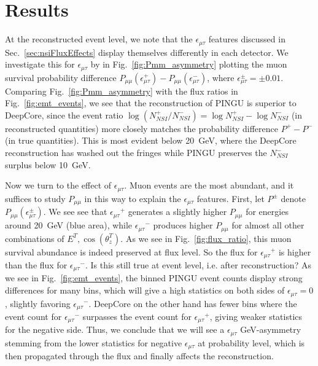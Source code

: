 \documentclass[draft=True]{revtex4-2}
\newcommand{\ztrue}{\ensuremath{\cos{(\theta_z^{T})}}}
\newcommand{\emt}{\ensuremath{\epsilon_{\mu\tau}}}
\newcommand{\Etrue}{E^{T}}
\begin{document}
\section{Results}
At the reconstructed event level, we note that the $\emt$ features discussed in Sec.~\ref{sec:nsiFluxEffects} display themselves differently in each detector.
We investigate this for $\emt$ by in Fig.~\ref{fig:Pmm_asymmetry} plotting the muon survival probability difference $P_{\mu\mu}(\epsilon^+_{\mu\tau}) - P_{\mu\mu}(\epsilon^-_{\mu\tau})$, where 
$\epsilon^\pm_{\mu\tau} = \pm 0.01$.
Comparing Fig.~\ref{fig:Pmm_asymmetry} with the flux ratios in Fig.~\ref{fig:emt_events}, we see that the reconstruction of PINGU is
superior to DeepCore, since the event ratio $\log{(N^+_{NSI}/N^-_{NSI})} = \log{N^+_{NSI}} - \log{N^-_{NSI}}$ (in reconstructed quantities) 
more closely matches the probability difference $P^+-P^-$ (in true quantities).
This is most evident below \SI{20}{\GeV}, where the DeepCore reconstruction has washed out the fringes while PINGU preserves the $N^-_{NSI}$ surplus below \SI{10}{\GeV}.

Now we turn to the effect of $\emt$. Muon events are the most abundant, and it suffices to study $P_{\mu\mu}$ in this way to explain the $\emt$ features. 
First, let $P^\pm$ denote $P_{\mu\mu}(\epsilon^\pm_{\mu\tau})$. 
We see see that $\emt^+$ generates a slightly higher $P_{\mu\mu}$ for energies around \SI{20}{\GeV} (blue area),
while $\emt^-$ produces higher $P_{\mu\mu}$ for almost all other combinations of ${\Etrue,\ztrue}$. As we see in Fig.~\ref{fig:flux_ratio}, this muon survival abundance 
is indeed preserved at flux level. So the flux for $\emt^+$ is higher than the flux for $\emt^-$. Is this still true at event level, i.e. after reconstruction? 
As we see in Fig.~\ref{fig:emt_events}, the binned PINGU event counts display strong differences for many bins, which will give a high statistics on both sides of $\emt=0$, slightly favoring $\emt^-$. 
DeepCore on the other hand has fewer bins where the event count for $\emt^-$ surpasses the event count for $\emt^+$, 
giving weaker statistics for the negative side. Thus, we conclude that we will see a $\emt$ \si{GeV}-asymmetry stemming from the lower statistics 
for negative $\emt$ at probability level, which is then propagated through the flux and finally affects the reconstruction. %
\end{document}
